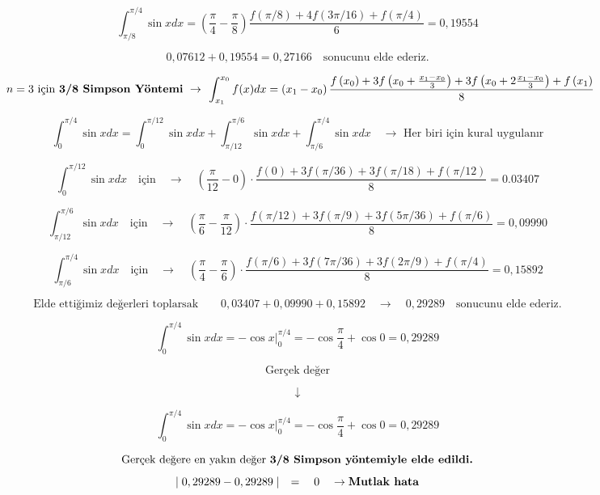 \documentclass[a4paper,10pt]{article}
\begin{document}
$$\int_{\pi / 8}^{\pi / 4} \sin x d x=\left(\frac{\pi}{4}-\frac{\pi}{8}\right) \frac{f(\pi / 8)+4 f(3 \pi / 16)+f(\pi / 4)}{6}=0,19554$$

$$0,07612+0,19554 = 0,27166 \quad \text{sonucunu elde ederiz.}$$

$$\begin{array}{c}
n=3 \text { için \textbf{3/8 Simpson Yöntemi} } \rightarrow \\
\end{array} \int_{x_{1}}^{x_{0}} f(x) d x=\left(x_{1}-x_{0}\right) \frac{f\left(x_{0}\right)+3 f\left(x_{0}+\frac{x_{1}-x_{0}}{3}\right)+3 f\left(x_{0}+2 \frac{x_{1}-x_{0}}{3}\right)+f\left(x_{1}\right)}{8}$$

$$\int_{0}^{\pi / 4} \sin x d x=\int_{0}^{\pi / 12} \sin x d x + \int_{\pi / 12}^{\pi / 6} \sin x d x+\int_{\pi / 6}^{\pi / 4} \sin x d x \quad \rightarrow \text{ Her biri için kural uygulanır}$$

\vspace{0.5cm}

$$\int_{0}^{\pi / 12} \sin x d x \quad \text{için} \quad \rightarrow \quad \left(\frac{\pi}{12}-0\right) \cdot \frac{f(0)+3 f(\pi / 36)+3 f(\pi / 18)+f(\pi / 12)}{8}=0.03407$$

$$\int_{\pi / 12}^{\pi / 6} \sin x d x \quad \text{için} \quad \rightarrow \quad \left(\frac{\pi}{6}-\frac{\pi}{12}\right) \cdot \frac{f(\pi / 12)+3 f(\pi / 9)+3 f(5 \pi / 36)+f(\pi / 6)}{8}=0,09990$$

$$\int_{\pi / 6}^{\pi / 4} \sin x d x \quad \text{için} \quad \rightarrow \quad \left(\frac{\pi}{4}-\frac{\pi}{6}\right) \cdot \frac{f(\pi / 6)+3 f(7 \pi / 36)+3 f(2 \pi / 9)+f(\pi / 4)}{8}=0,15892$$

\vspace{0.5cm}

$$ \text{Elde ettiğimiz değerleri toplarsak} \quad \quad 0,03407 + 0,09990 + 0,15892 \quad \rightarrow \quad 0,29289 \quad \text{sonucunu elde ederiz.}$$

$$\int_{0}^{\pi / 4} \sin x d x=-\left.\cos x\right|_{0} ^{\pi / 4}=-\cos \frac{\pi}{4}+\cos 0=0,29289$$

\vspace{0.5cm}

$$\text{Gerçek değer}$$

$$\downarrow$$

$$\int_{0}^{\pi / 4} \sin x d x=-\left.\cos x\right|_{0} ^{\pi / 4}=-\cos \frac{\pi}{4}+\cos 0=0,29289$$

$$\text{Gerçek değere en yakın değer \textbf{3/8 Simpson yöntemiyle elde edildi.}} $$
$$\mid0,29289 - 0,29289\mid \quad = \quad 0 \quad \rightarrow \text{\textbf{Mutlak hata}}$$
\end{document}
